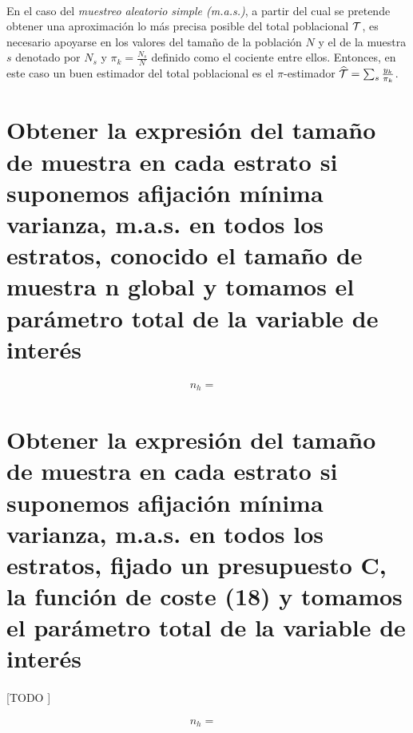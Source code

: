 \documentclass{article}
\begin{document}
    \paragraph{}
    En el caso del \emph{muestreo aleatorio simple (m.a.s.)}, a partir del cual se pretende obtener una aproximación lo más precisa posible del total poblacional $\mathcal{T}$, es necesario apoyarse en los valores del tamaño de la población $N$ y el de la muestra $s$ denotado por $N_s$ y $\pi_k = \frac{N_s}{N}$ definido como el cociente entre ellos. Entonces, en este caso un buen estimador del total poblacional es el $\pi$-estimador $\widehat{\mathcal{T}} = \sum_s \frac{y_k}{\pi_k}$.


  \section{Obtener la expresión del tamaño de muestra en cada estrato si suponemos afijación mínima varianza,  m.a.s. en todos los estratos, conocido el tamaño de muestra n global y tomamos el parámetro total de la variable de interés}

    \paragraph{}


    \begin{align}
      n_h =&
    \end{align}

  \section{Obtener la expresión del tamaño de muestra en cada estrato si suponemos afijación mínima varianza,  m.a.s. en todos los estratos, fijado un presupuesto C, la función de coste (18)  y tomamos el parámetro total de la variable de interés}

    \paragraph{}
    [TODO ]

    \begin{align}
      n_h =&
    \end{align}



  \nocite{muest2017}
  \nocite{sarndal2003model}

  
  
\end{document}
